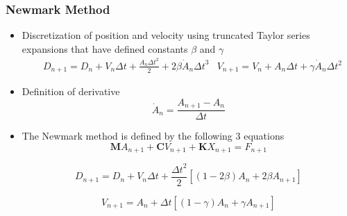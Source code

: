 \documentclass[xcolor=svgnames,9pt]{beamer}
\theoremstyle{remark}
\begin{document}
		\begin{frame}
  			\frametitle{Newmark Method}
			\begin{itemize}
				\item Discretization of position and velocity using truncated Taylor series expansions that have defined constants $\beta$ and $\gamma$
				\begin{align}
					&D_{n+1} = D_{n}+V_{n}\Delta t+\frac{A_{{n}}{\Delta t}^{2}}{2}+2\beta \dot{A}_{n}{\Delta t}^3
					&V_{n+1} = V_{n}+A_{n}\Delta t+\gamma \dot{A}_{n} \Delta t^2
				\end{align}
				\item Definition of derivative
				\begin{equation*}
					\dot{A}_{n} = \frac {A_{{n+1}}-A_{{n}}}{\Delta t}
				\end{equation*}
				\item The Newmark method is defined by the following 3 equations
				\begin{equation}
					\textbf{M}A_{n+1}+\textbf{C}V_{n+1}+\textbf{K}X_{n+1} =F_{n+1}
				\end{equation}

				\begin{equation}
					D_{n+1} = D_{n}+V_{n}\Delta t+\frac{{\Delta t}^{2}}{2}[(1-2\beta)A_n + 2\beta A_{n+1}]
				\end{equation}

				\begin{equation}
					V_{n+1} = A_{n}+\Delta t[(1-\gamma)A_n + \gamma A_{n+1}]
				\end{equation}

			\end{itemize}
		\end{frame}
\end{document}
